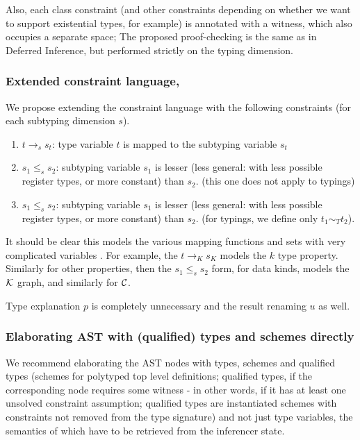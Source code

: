 Also, each class constraint (and other constraints depending on whether we want to support existential types, for example) is annotated with a witness, which also occupies a separate space; The proposed proof-checking is the same as in Deferred Inference, but performed strictly on the typing dimension.

\subsubsection{Extended constraint language, }

We propose extending the constraint language with the following constraints (for each subtyping dimension $s$).

\begin{enumerate}
    \item $t \to_s s_t$: type variable $t$ is mapped to the subtyping variable $s_t$

    \item $s_1 \leq_s s_2$: subtyping variable $s_1$ is lesser (less general: with less possible register types, or more constant) than $s_2$. (this one does not apply to typings)

    \item $s_1 \leq_s s_2$: subtyping variable $s_1$ is lesser (less general: with less possible register types, or more constant) than $s_2$. (for typings, we define only $t_1 \sim_T t_2$).
\end{enumerate}

\begin{remark}
    It should be clear this models the various mapping functions and sets with very complicated variables . For example, the $t \to_K s_K$ models the $k$ type property. Similarly for other properties, then the $s_1 \leq_s s_2$ form, for data kinds, models the $\mathcal{K}$ graph, and similarly for $\mathcal{C}$.

    Type explanation $p$ is completely unnecessary and the result renaming $u$ as well.
\end{remark}

\subsubsection{Elaborating AST with (qualified) types and schemes directly}

We recommend elaborating the AST nodes with types, schemes and qualified types (schemes for polytyped top level definitions; qualified types, if the corresponding node requires some witness - in other words, if it has at least one unsolved constraint assumption; qualified types are instantiated schemes with constraints not removed from the type signature) and not just type variables, the semantics of which have to be retrieved from the inferencer state.

